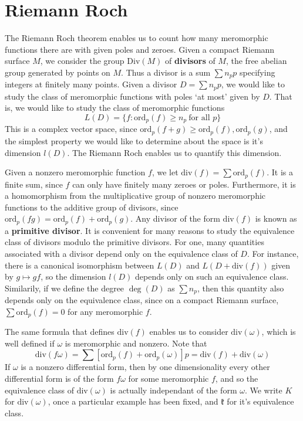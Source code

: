 \section{Riemann Roch}

The Riemann Roch theorem enables us to count how many meromorphic functions there are with given poles and zeroes. Given a compact Riemann surface $M$, we consider the group $\text{Div}(M)$ of {\bf divisors} of $M$, the free abelian group generated by points on $M$. Thus a divisor is a sum $\sum n_p p$ specifying integers at finitely many points. Given a divisor $D = \sum n_p p$, we would like to study the class of meromorphic functions with poles `at most' given by $D$. That is, we would like to study the class of meromorphic functions
%
\[ L(D) = \{ f: \text{ord}_p(f) \geq n_p\ \text{for all $p$} \} \]
%
This is a complex vector space, since $\text{ord}_p(f + g) \geq \text{ord}_p(f), \text{ord}_p(g)$, and the simplest property we would like to determine about the space is it's dimension $l(D)$. The Riemann Roch enables us to quantify this dimension.

Given a nonzero meromorphic function $f$, we let $\text{div}(f) = \sum \text{ord}_p(f)$. It is a finite sum, since $f$ can only have finitely many zeroes or poles. Furthermore, it is a homomorphism from the multiplicative group of nonzero meromorphic functions to the additive group of divisors, since $\text{ord}_p(fg) = \text{ord}_p(f) + \text{ord}_p(g)$. Any divisor of the form $\text{div}(f)$ is known as a {\bf primitive divisor}. It is convenient for many reasons to study the equivalence class of divisors modulo the primitive divisors. For one, many quantities associated with a divisor depend only on the equivalence class of $D$. For instance, there is a canonical isomorphism between $L(D)$ and $L(D + \text{div}(f))$ given by $g \mapsto gf$, so the dimension $l(D)$ depends only on such an equivalence class. Similarily, if we define the degree $\deg(D)$ as $\sum n_p$, then this quantity also depends only on the equivalence class, since on a compact Riemann surface, $\sum \text{ord}_p(f) = 0$ for any meromorphic $f$.

The same formula that defines $\text{div}(f)$ enables us to consider $\text{div}(\omega)$, which is well defined if $\omega$ is meromorphic and nonzero. Note that
%
\[ \text{div}(f \omega) = \sum [\text{ord}_p(f) + \text{ord}_p(\omega)] p = \text{div}(f) + \text{div}(\omega) \]
%
If $\omega$ is a nonzero differential form, then by one dimensionality every other differential form is of the form $f \omega$ for some meromorphic $f$, and so the equivalence class of $\text{div}(\omega)$ is actually independant of the form $\omega$. We write $K$ for $\text{div}(\omega)$, once a particular example has been fixed, and $\mathfrak{k}$ for it's equivalence class.

